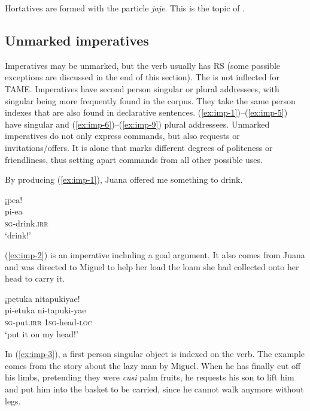 Hortatives are formed with the  particle \textit{jaje}. This is the topic of .



\subsection{Unmarked imperatives}\label{sec:UnmarkedImperatives}

Imperatives may be unmarked, but the verb usually has  RS (some possible exceptions are discussed in the end of this section). The  is not inflected for TAME. Imperatives have second person singular or plural addressees, with singular being more frequently found in the corpus. They take the same person indexes that are also found in declarative sentences. (\ref{ex:imp-1})--(\ref{ex:imp-5}) have singular and (\ref{ex:imp-6})--(\ref{ex:imp-9}) plural addressees. Unmarked imperatives do not only express commands, but also requests or invitations/offers. It is  alone that marks different degrees of politeness or friendliness, thus setting apart commands from all other possible uses.

By producing (\ref{ex:imp-1}), Juana offered me something to drink.

\ea\label{ex:imp-1}
\begingl
\glpreamble ¡pea!\\
\gla pi-ea\\
\textsc{sg}-drink.\textsc{irr}\\
\glft ‘drink!’
\endgl
\trailingcitation{[jxx-p150920l.002]}
\xe

(\ref{ex:imp-2}) is an imperative including a goal argument. It also comes from Juana and was directed to Miguel to help her load the loam she had collected onto her head to carry it.

\ea\label{ex:imp-2}
\begingl
\glpreamble ¡petuka nitapukiyae!\\
\gla pi-etuka ni-tapuki-yae\\
\textsc{sg}-put.\textsc{irr} 1\textsc{sg}-head-\textsc{loc}\\
\glft ‘put it on my head!’
\endgl
\trailingcitation{[jmx-d110918ls-1.110]}
\xe

In (\ref{ex:imp-3}), a first person singular object is indexed on the verb. The example comes from the story about the lazy man by Miguel. When he has finally cut off his limbs, pretending they were \textit{cusi} palm fruits, he requests his son to lift him and put him into the basket to be carried, since he cannot walk anymore without legs.

